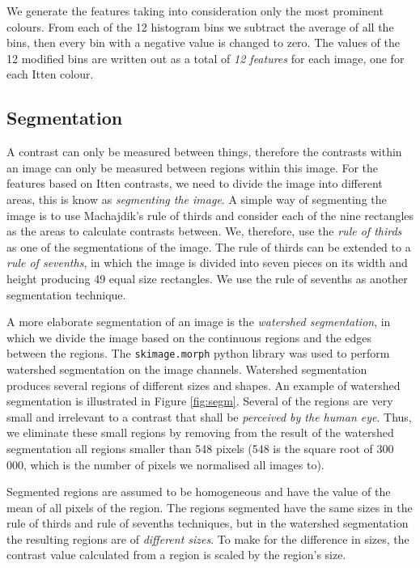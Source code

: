 \documentclass[11pt,a4paper,twoside,openright]{report}
\begin{document}
We generate the features taking into consideration only the most prominent
colours.  From each of the 12 histogram bins we subtract the average of all the
bins, then every bin with a negative value is changed to zero.  The values of
the 12 modified bins are written out as a total of \emph{12 features} for each
image, one for each Itten colour.

\subsection{Segmentation}

A contrast can only be measured between things, therefore the contrasts within
an image can only be measured between regions within this image.  For the
features based on Itten contrasts, we need to divide the image into different
areas, this is know as \emph{segmenting the image}.  A simple way of segmenting
the image is to use Machajdik's rule of thirds \cite{mach10clas} and consider
each of the nine rectangles as the areas to calculate contrasts between.  We,
therefore, use the \emph{rule of thirds} as one of the segmentations of the
image.  The rule of thirds can be extended to a \emph{rule of sevenths}, in
which the image is divided into seven pieces on its width and height producing
49 equal size rectangles.  We use the rule of sevenths as another segmentation
technique.

A more elaborate segmentation of an image is the \emph{watershed segmentation},
in which we divide the image based on the continuous regions and the edges
between the regions.  The \texttt{skimage.morph} python library was used to
perform watershed segmentation on the image channels.  Watershed segmentation
produces several regions of different sizes and shapes.  An example of
watershed segmentation is illustrated in Figure \ref{fig:segm}.  Several of the
regions are very small and irrelevant to a contrast that shall be
\emph{perceived by the human eye}.  Thus, we eliminate these small regions by
removing from the result of the watershed segmentation all regions smaller than
548 pixels (548 is the square root of 300 000, which is the number of pixels we
normalised all images to).

Segmented regions are assumed to be homogeneous and have the value of the mean
of all pixels of the region.  The regions segmented have the same sizes in the
rule of thirds and rule of sevenths techniques, but in the watershed
segmentation the resulting regions are of \emph{different sizes}.  To make for
the difference in sizes, the contrast value calculated from a region is scaled
by the region's size.
\end{document}
